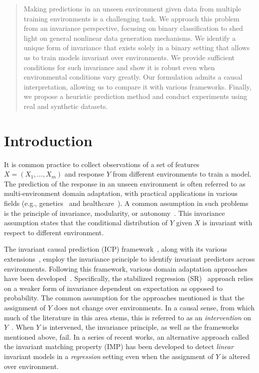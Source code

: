 \documentclass[conference,letterpaper]{IEEEtran}
\begin{document}
\begin{abstract}
 Making predictions in an unseen environment given data from multiple training environments is a challenging task. We approach this problem from an invariance perspective, focusing on binary classification to shed light on general nonlinear data generation mechanisms. We identify a unique form of invariance that exists solely in a binary setting that allows us to train models invariant over environments. We provide sufficient conditions for such invariance and show it is robust even when environmental conditions vary greatly. Our formulation admits a causal interpretation, allowing us to compare it with various frameworks. Finally, we propose a heuristic prediction method and conduct experiments using real and synthetic datasets. 
\end{abstract}

\section{Introduction}

It is common practice to collect observations of a set of features $X=(X_1,\dots, X_m)$ and response $Y$ from different environments to train a model. The prediction of the response in an unseen environment is often referred to as multi-environment domain adaptation, with practical applications in various fields (e.g., genetics~\cite{meinshausen2016methods} and healthcare~\cite{goddard2022invariance}). A common assumption in such problems is the principle of invariance, modularity, or autonomy~\cite{haavelmo1944probability, aldrich1989autonomy,hoover1990logic,scholkopf2012causal,dawid2010identifying,pearl2009causality}. This invariance assumption states that the conditional distribution of $Y$ given $X$ is invariant with respect to different environment. 

%

The invariant causal prediction (\textsf{ICP}) framework~\cite{peters2016causal}, along with its various extensions~\cite{heinze2018invariant,pfister2019invariant}, employ the invariance principle to identify invariant predictors across environments. Following this framework, various domain adaptation approaches have been developed~\cite{rojas2018invariant,rothenhausler2021anchor,pfister2021stabilizing}. Specifically, the stabilized regression (\textsf{SR})~\cite{pfister2021stabilizing} approach relies on a weaker form of invariance dependent on expectation as opposed to probability. The common assumption for the approaches mentioned is that the assignment of $Y$ does not change over environments. In a causal sense, from which much of the literature in this area stems, this is referred to as an \emph{intervention} on $Y$~\cite{pearl2009causality}. When $Y$ is intervened, the invariance principle, as well as the frameworks mentioned above,  fail. In a series of recent works\cite{du2023learning,du2023generalized}, an alternative approach called the invariant matching property (\textsf{IMP}) has been developed to detect \emph{linear} invariant models in a \emph{regression} setting even when the assignment of $Y$ is altered over environment.
\end{document}
